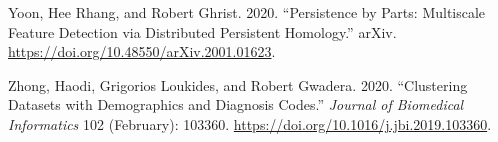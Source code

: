 \documentclass{article}
\newlength{\cslhangindent}
\newlength{\cslentryspacingunit} %
\newenvironment{CSLReferences}[2] %
 {%
  \setlength{\parindent}{0pt}
  \ifodd #1
  \let\oldpar\par
  \def\par{\hangindent=\cslhangindent\oldpar}
  \fi
  \setlength{\parskip}{#2\cslentryspacingunit}
 }%
 {}
\begin{document}
\begin{CSLReferences}{1}{0}
\leavevmode{}%
Yoon, Hee Rhang, and Robert Ghrist. 2020. {``Persistence by {Parts}:
{Multiscale Feature Detection} via {Distributed Persistent Homology}.''}
{arXiv}. \url{https://doi.org/10.48550/arXiv.2001.01623}.

\leavevmode{}%
Zhong, Haodi, Grigorios Loukides, and Robert Gwadera. 2020.
{``Clustering Datasets with Demographics and Diagnosis Codes.''}
\emph{Journal of Biomedical Informatics} 102 (February): 103360.
\url{https://doi.org/10.1016/j.jbi.2019.103360}.

\end{CSLReferences}



\end{document}
